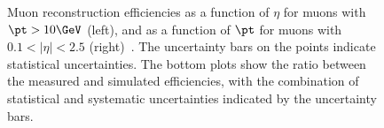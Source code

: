 \begin{figure}[htbp]
	\centering
	\hfill
	\caption{Muon reconstruction efficiencies as a function of $\eta$ for muons with $\pt>10 \GeV$ (left), and as a function of $\pt$ for muons with $0.1<|\eta|<2.5$ (right)~\cite{TheATLASCollaboration:2014bm}. The uncertainty bars on the points indicate statistical uncertainties. The bottom plots show the ratio between the measured and simulated efficiencies, with the combination of statistical and systematic uncertainties indicated by the uncertainty bars.}
	\label{fig:reco-muon-efficiency}
\end{figure}


